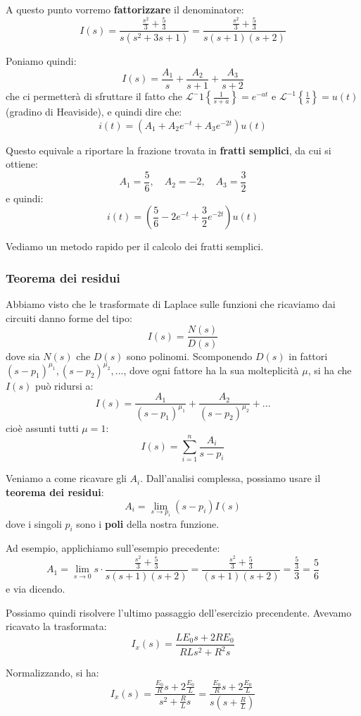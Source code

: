 \documentclass[a4paper,11pt]{article}
\begin{document}
A questo punto vorremo \textbf{fattorizzare} il denominatore:
$$
I(s) = \frac{\frac{s^2}{3} + \frac{5}{3}}{s (s^2 + 3s +1)} = \frac{\frac{s^2}{3} + \frac{5}{3}}{s (s + 1) (s + 2)}
$$

Poniamo quindi:
$$
I(s) = \frac{A_1}{s} + \frac{A_2}{s + 1} + \frac{A_3}{s+2}
$$
che ci permetterà di sfruttare il fatto che $\mathcal{L}^-1\left\{ \frac{1}{s + a} \right\} = e^{-at}$ e $\mathcal{L}^{-1} \left\{ \frac{1}{s} \right\} = u(t)$ (gradino di Heaviside), e quindi dire che:
$$
i(t) = \left( A_1 + A_2 e^{-t} + A_3 e^{-2t} \right) u(t)
$$

Questo equivale a riportare la frazione trovata in \textbf{fratti semplici}, da cui si ottiene:
$$
A_1 = \frac{5}{6}, \quad A_2 = -2, \quad A_3 = \frac{3}{2} 
$$
e quindi:
$$
i(t) = \left( \frac{5}{6} -2e^{-t} + \frac{3}{2}e^{-2t} \right) u(t)
$$

Vediamo un metodo rapido per il calcolo dei fratti semplici.

\subsubsection{Teorema dei residui}
Abbiamo visto che le trasformate di Laplace sulle funzioni che ricaviamo dai circuiti danno forme del tipo:
$$
I(s) = \frac{N(s)}{D(s)}
$$
dove sia $N(s)$ che $D(s)$ sono polinomi.
Scomponendo $D(s)$ in fattori $(s - p_1)^{\mu_1}, (s - p_2)^{\mu_2}, ...$, dove ogni fattore ha la sua molteplicità $\mu$, si ha che $I(s)$ può ridursi a:
$$
I(s) = \frac{A_1}{(s - p_1)^{\mu_1}} + \frac{A_2}{(s - p_2)^{\mu_2}} + ...
$$
cioè assunti tutti $\mu = 1$:
$$
I(s) = \sum_{i = 1}^n \frac{A_i}{s - p_i}
$$

Veniamo a come ricavare gli $A_i$.
Dall'analisi complessa, possiamo usare il \textbf{teorema dei residui}:
$$
A_i = \lim_{s \rightarrow p_i} (s - p_i) I(s)
$$
dove i singoli $p_i$ sono i \textbf{poli} della nostra funzione.

Ad esempio, applichiamo sull'esempio precedente:
$$
A_1 = \lim_{s \rightarrow 0} s \cdot \frac{\frac{s^2}{3} + \frac{5}{3}}{s(s+1)(s+2)}
= \frac{\frac{s^2}{3} + \frac{5}{3}}{(s+1)(s+2)} = \frac{\frac{5}{3}}{3} = \frac{5}{6}
$$
e via dicendo.

\par\medskip

Possiamo quindi risolvere l'ultimo passaggio dell'esercizio precendente.
Avevamo ricavato la trasformata:
$$
I_x(s) = \frac{L E_0 s + 2 R E_0}{R L s^2 + R^2 s}
$$

Normalizzando, si ha:
$$
I_x(s) = \frac{\frac{E_0}{R} s + 2 \frac{E_0}{L}}{s^2 + \frac{R}{L}s} = \frac{\frac{E_0}{R} s + 2 \frac{E_0}{L}}{s \left(s + \frac{R}{L}\right)}
$$
\end{document}
